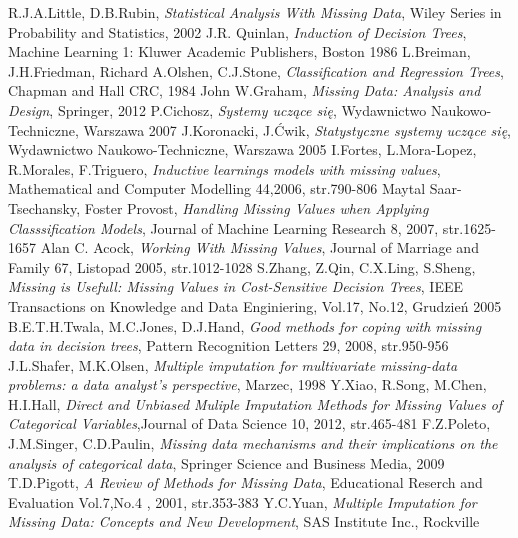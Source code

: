 \documentclass[a4paper,11pt,twoside]{report}
\theoremstyle{definition}
\begin{document}
\begin{thebibliography}{25}%
 R.J.A.Little, D.B.Rubin, \textit{Statistical Analysis With Missing Data}, Wiley Series in Probability and Statistics, 2002
 J.R. Quinlan, \textit{Induction of Decision Trees}, Machine Learning 1: Kluwer Academic Publishers, Boston 1986
 L.Breiman, J.H.Friedman, Richard A.Olshen, C.J.Stone, \textit{Classification and Regression Trees}, Chapman and Hall CRC, 1984
 John W.Graham, \textit{Missing Data: Analysis and Design}, Springer, 2012
 P.Cichosz, \textit{Systemy uczące się}, Wydawnictwo Naukowo-Techniczne, Warszawa 2007
 J.Koronacki, J.Ćwik, \textit{Statystyczne systemy uczące się}, Wydawnictwo Naukowo-Techniczne, Warszawa 2005
 I.Fortes, L.Mora-Lopez, R.Morales, F.Triguero, \textit{Inductive learnings models with missing values}, Mathematical and Computer Modelling 44,2006, str.790-806
 Maytal Saar-Tsechansky, Foster Provost, \textit{Handling Missing Values when Applying Classsification Models}, Journal of Machine Learning Research 8, 2007, str.1625-1657
 Alan C. Acock, \textit{Working With Missing Values}, Journal of Marriage and Family 67, Listopad 2005, str.1012-1028
 S.Zhang, Z.Qin, C.X.Ling, S.Sheng, \textit{Missing is Usefull: Missing Values in Cost-Sensitive Decision Trees}, IEEE Transactions on Knowledge and Data Enginiering, Vol.17, No.12, Grudzień 2005 
 B.E.T.H.Twala, M.C.Jones, D.J.Hand, \textit{Good methods for coping with missing data in decision trees}, Pattern Recognition Letters 29, 2008, str.950-956
 J.L.Shafer, M.K.Olsen, \textit{Multiple imputation for multivariate missing-data problems: a data analyst's perspective}, Marzec, 1998 
 Y.Xiao, R.Song, M.Chen, H.I.Hall, \textit{Direct and Unbiased Muliple Imputation Methods for Missing Values of Categorical Variables},Journal of Data Science 10, 2012, str.465-481
 F.Z.Poleto, J.M.Singer, C.D.Paulin, \textit{Missing data mechanisms and their implications on the analysis of categorical data}, Springer Science and Business Media, 2009
 T.D.Pigott, \textit{A Review of Methods for Missing Data}, Educational Reserch and Evaluation Vol.7,No.4 , 2001, str.353-383
 Y.C.Yuan, \textit{Multiple Imputation for Missing Data: Concepts and New Development}, SAS Institute Inc., Rockville

\end{thebibliography}
\end{document}
